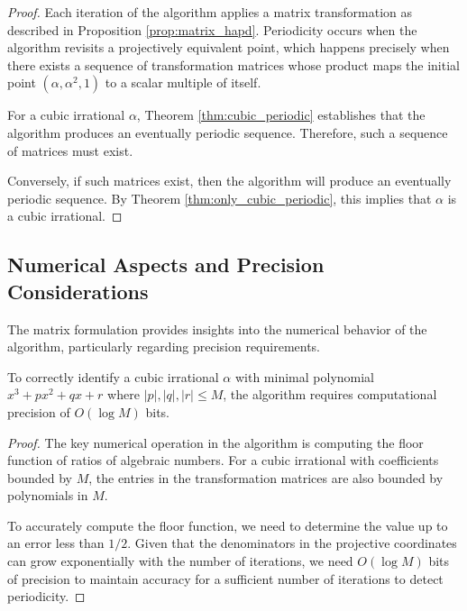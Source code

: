 \begin{proof}
Each iteration of the \HAPD{} algorithm applies a matrix transformation as described in Proposition \ref{prop:matrix_hapd}. Periodicity occurs when the algorithm revisits a projectively equivalent point, which happens precisely when there exists a sequence of transformation matrices whose product maps the initial point $(\alpha, \alpha^2, 1)$ to a scalar multiple of itself.

For a cubic irrational $\alpha$, Theorem \ref{thm:cubic_periodic} establishes that the \HAPD{} algorithm produces an eventually periodic sequence. Therefore, such a sequence of matrices must exist.

Conversely, if such matrices exist, then the \HAPD{} algorithm will produce an eventually periodic sequence. By Theorem \ref{thm:only_cubic_periodic}, this implies that $\alpha$ is a cubic irrational.
\end{proof}

\subsection{Numerical Aspects and Precision Considerations}

The matrix formulation provides insights into the numerical behavior of the \HAPD{} algorithm, particularly regarding precision requirements.

\begin{proposition}\label{prop:precision}
To correctly identify a cubic irrational $\alpha$ with minimal polynomial $x^3 + px^2 + qx + r$ where $|p|, |q|, |r| \leq M$, the \HAPD{} algorithm requires computational precision of $O(\log M)$ bits.
\end{proposition}

\begin{proof}
The key numerical operation in the \HAPD{} algorithm is computing the floor function of ratios of algebraic numbers. For a cubic irrational with coefficients bounded by $M$, the entries in the transformation matrices are also bounded by polynomials in $M$. 

To accurately compute the floor function, we need to determine the value up to an error less than $1/2$. Given that the denominators in the projective coordinates can grow exponentially with the number of iterations, we need $O(\log M)$ bits of precision to maintain accuracy for a sufficient number of iterations to detect periodicity.
\end{proof}

